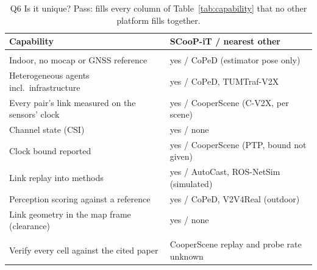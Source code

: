 \begin{table}[t]
\centering
\caption{Q6 Is it unique? Pass: fills every column of
Table~\ref{tab:capability} that no other platform fills together.}
\label{tab:res_q6}
\footnotesize
\setlength{\tabcolsep}{3pt}
\begin{tabularx}{\columnwidth}{@{}>{\raggedright\arraybackslash}X l@{}}
\toprule
Capability & SCooP-iT / nearest other \\
\midrule
\multicolumn{2}{@{}l}{\emph{Answered}} \\
Indoor, no mocap or GNSS reference & yes / CoPeD (estimator pose only) \\
Heterogeneous agents incl.\ infrastructure & yes / CoPeD, TUMTraf-V2X \\
Every pair's link measured on the sensors' clock & yes / CooperScene (C-V2X, per scene) \\
Channel state (CSI) & yes / none \\
Clock bound reported & yes / CooperScene (PTP, bound not given) \\
Link replay into methods & yes / AutoCast, ROS-NetSim (simulated) \\
Perception scoring against a reference & yes / CoPeD, V2V4Real (outdoor) \\
Link geometry in the map frame (clearance) & yes / none \\
\midrule
\multicolumn{2}{@{}l}{\emph{Still needed}} \\
Verify every cell against the cited paper & CooperScene replay and probe rate unknown \\
\bottomrule
\end{tabularx}
\end{table}
